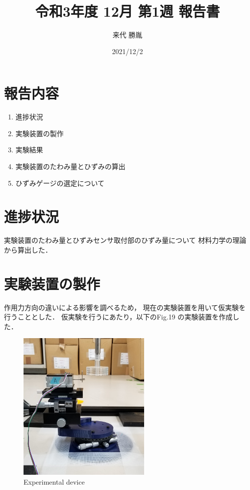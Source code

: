 \documentclass[twocolumn,a4j]{jsarticle}
\author{来代 勝胤}
\title{令和3年度 12月 第1週 報告書}
\date{2021/12/2}
\begin{document}
\columnseprule=0.1mm

\maketitle
\section*{報告内容}
\begin{enumerate}[1.]
    \item 進捗状況
    \item 実験装置の製作
    \item 実験結果
    \item 実験装置のたわみ量とひずみの算出
    \item ひずみゲージの選定について
\end{enumerate}

\section{進捗状況}
実験装置のたわみ量とひずみセンサ取付部のひずみ量について
材料力学の理論から算出した．

\section{実験装置の製作}
作用力方向の違いによる影響を調べるため，
現在の実験装置を用いて仮実験を行うこととした．
仮実験を行うにあたり，以下のFig.19 の実験装置を作成した．
\begin{figure}[htbp]
    \footnotesize
    \begin{center}
        \includegraphics[width=65mm]{../images/device_1.jpg}
        \caption{Experimental device}
    \end{center}
\end{figure}
\end{document}
